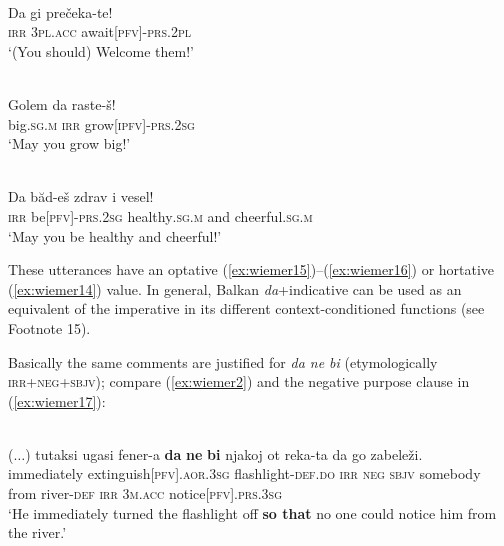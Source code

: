 \documentclass[output=paper,colorlinks,citecolor=brown]{langscibook}
\begin{document}
\ea
\label{ex:wiemer14} 
\\
\gll Da gi prečeka-te! \\
\textsc{irr} \textsc{3pl.acc} await\textsc{[pfv]-prs.2pl} \\
\glt `(You should) Welcome them!'
\z


\ea
\label{ex:wiemer15} 
\\
\gll Golem da raste-š! \\
big\textsc{.sg.m} \textsc{irr} grow\textsc{[ipfv]-prs.2sg} \\
\glt `May you grow big!'
\z

\ea
\label{ex:wiemer16} 
 \\
\gll Da băd-eš zdrav i vesel! \\
\textsc{irr} be\textsc{[pfv]-prs.2sg} healthy\textsc{.sg.m} and cheerful\textsc{.sg.m} \\
\glt `May you be healthy and cheerful!' \\

\z


\noindent These utterances have an optative (\ref{ex:wiemer15})--(\ref{ex:wiemer16}) or hortative (\ref{ex:wiemer14}) value. In general, Balkan  \textit{da}+indicative can be used as an equivalent of the imperative in its different context-conditioned functions (see Footnote 15).


Basically the same comments are justified for  \textit{da ne bi} (etymologically \textsc{irr+neg+sbjv}); compare (\ref{ex:wiemer2}) and the negative purpose clause in (\ref{ex:wiemer17}):


\ea
\label{ex:wiemer17} 
 \\
\gll \textnormal{($\ldots$)} tutaksi ugasi fener-a \textbf{da} \textbf{ne} \textbf{bi} njakoj ot reka-ta da go zabeleži.	\\
{} immediately extinguish\textsc{[pfv].aor.3sg} flashlight-\textsc{def.do} \textsc{irr} \textsc{neg} \textsc{sbjv} somebody from river-\textsc{def} \textsc{irr} \textsc{3m.acc} notice\textsc{[pfv].prs.3sg} \\
\glt `He immediately turned the flashlight off \textbf{so that} no one could notice him from the river.' \\
\z
\end{document}
